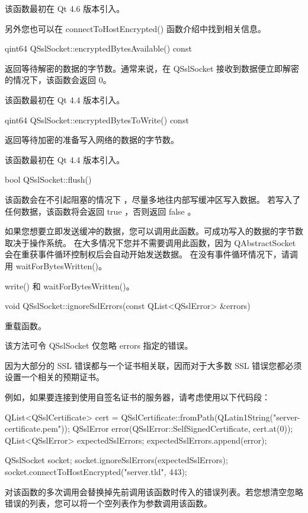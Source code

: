 该函数最初在 Qt 4.6 版本引入。

另外您也可以在 connectToHostEncrypted() 函数介绍中找到相关信息。

qint64 QSslSocket::encryptedBytesAvailable() const

返回等待解密的数据的字节数。通常来说，在 QSslSocket 接收到数据便立即解密的情况下，该函数会返回 0。

该函数最初在 Qt 4.4 版本引入。

qint64 QSslSocket::encryptedBytesToWrite() const

返回等待加密的准备写入网络的数据的字节数。

该函数最初在 Qt 4.4 版本引入。

bool QSslSocket::flush()

该函数会在不引起阻塞的情况下 ，尽量多地往内部写缓冲区写入数据。
若写入了任何数据，该函数将会返回 true ，否则返回 false 。

如果您想要立即发送缓冲的数据，您可以调用此函数。可成功写入的数据的字节数取决于操作系统。
在大多情况下您并不需要调用此函数，因为 QAbstractSocket 会在重获事件循环控制权后会自动开始发送数据。
在没有事件循环情况下，请调用 waitForBytesWritten()。

\begin{seeAlso}
write() 和 waitForBytesWritten()。
\end{seeAlso}

void QSslSocket::ignoreSslErrors(const QList<QSslError> \&errors)

重载函数。

该方法可令 QSslSocket 仅忽略 errors 指定的错误。

\begin{notice}
因为大部分的 SSL 错误都与一个证书相关联，因而对于大多数 SSL 错误您都必须设置一个相关的预期证书。
\end{notice}

例如，如果要连接到使用自签名证书的服务器，请考虑使用以下代码段：

\begin{seeAlso}
 QList<QSslCertificate> cert = QSslCertificate::fromPath(QLatin1String("server-certificate.pem"));
 QSslError error(QSslError::SelfSignedCertificate, cert.at(0));
 QList<QSslError> expectedSslErrors;
 expectedSslErrors.append(error);

 QSslSocket socket;
 socket.ignoreSslErrors(expectedSslErrors);
 socket.connectToHostEncrypted("server.tld", 443);
\end{seeAlso}

对该函数的多次调用会替换掉先前调用该函数时传入的错误列表。若您想清空忽略错误的列表，您可以将一个空列表作为参数调用该函数。

